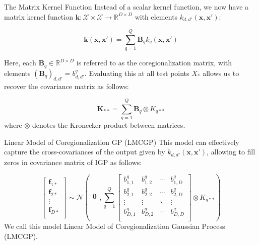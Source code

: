 \begin{frame}{The Matrix Kernel Function}
	Instead of a scalar kernel function, we now have a matrix kernel function $\mathbf{k}: \mathcal{X} \times \mathcal{X} \to \mathbb{R}^{D \times D}$ with elements $k_{d,d'}(\mathbf{x}, \mathbf{x}')$:
	
	\begin{equation*}\label{eq:lmc_covariance_function}
		\mathbf{k}(\mathbf{x}, \mathbf{x}') = \sum_{q=1}^Q \mathbf{B}_q k_{q}(\mathbf{x}, \mathbf{x}')
	\end{equation*}
	
	Here, each $\mathbf{B}_q \in \mathbb{R}^{D \times D}$ is referred to as the coregionalization matrix, with elements $(\mathbf{B}_q)_{d,d'} = b^q_{d, d'}$. Evaluating this at all test points $X_*$ allows us to recover the covariance matrix as follows:
	
	\begin{equation*}
		\mathbf{K}_{**} = \sum_{q=1}^Q \mathbf{B}_q \otimes K_{q**}
	\end{equation*}
	where $\otimes$ denotes the Kronecker product between matrices.
\end{frame}

\begin{frame}{Linear Model of Coregionalization GP (LMCGP)}
	This model can effectively capture the cross-covariances of the output given by $k_{d,d'}(\mathbf{x}, \mathbf{x}')$, allowing to fill zeros in covariance matrix of IGP as follows:
	
	\begin{equation*}
		\left[ \begin{array}{c}
			\mathbf{f}_{1*}\\
			\mathbf{f}_{2*}\\
			\vdots\\
			\mathbf{f}_{D*}\\
		\end{array}
		\right]
		\sim
		\mathcal{N} \left(
		\begin{array}{c}
			\mathbf{0}\\
		\end{array},
		\sum_{q=1}^Q
		\left[ \begin{array}{cccccc}
			b^q_{1, 1} & b^q_{1, 2} & \cdots & b^q_{1, D} \\
			b^q_{2, 1} & b^q_{2, 2} & \cdots & b^q_{2, D} \\
			\vdots & \vdots & \ddots & \vdots\\
			b^q_{D, 1} & b^q_{D, 2} & \cdots & b^q_{D, D}\\
		\end{array}
		\right] \otimes K_{q**}\right)
	\end{equation*}
	We call this model Linear Model of Coregionalization Gaussian Process (LMCGP).
\end{frame}

